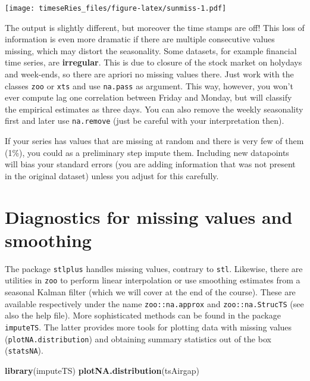 \documentclass[]{book}
\newenvironment{Shaded}{\begin{snugshade}}{\end{snugshade}}
\newcommand{\KeywordTok}[1]{\textcolor[rgb]{0.13,0.29,0.53}{\textbf{#1}}}
\newcommand{\NormalTok}[1]{#1}
\begin{document}
\texttt{[image: timeseRies\_files/figure-latex/sunmiss-1.pdf]}

The output is slightly different, but moreover the time stamps are off!
This loss of information is even more dramatic if there are multiple
consecutive values missing, which may distort the seasonality. Some
datasets, for example financial time series, are \textbf{irregular}.
This is due to closure of the stock market on holydays and week-ends, so
there are apriori no missing values there. Just work with the classes
\texttt{zoo} or \texttt{xts} and use \texttt{na.pass} as argument. This
way, however, you won't ever compute lag one correlation between Friday
and Monday, but will classify the empirical estimates as three days. You
can also remove the weekly seasonality first and later use
\texttt{na.remove} (just be careful with your interpretation then).

If your series has values that are missing at random and there is very
few of them (1\%), you could as a preliminary step impute them.
Including new datapoints will bias your standard errors (you are adding
information that was not present in the original dataset) unless you
adjust for this carefully.

\section{Diagnostics for missing values and
smoothing}\label{diagnostics-for-missing-values-and-smoothing}

The package \texttt{stlplus} handles missing values, contrary to
\texttt{stl}. Likewise, there are utilities in \texttt{zoo} to perform
linear interpolation or use smoothing estimates from a seasonal Kalman
filter (which we will cover at the end of the course). These are
available respectively under the name \texttt{zoo::na.approx} and
\texttt{zoo::na.StrucTS} (see also the help file). More sophisticated
methods can be found in the package \texttt{imputeTS}. The latter
provides more tools for plotting data with missing values
(\texttt{plotNA.distribution}) and obtaining summary statistics out of
the box (\texttt{statsNA}).

\begin{Shaded}
\begin{Highlighting}[]
\KeywordTok{library}\NormalTok{(imputeTS)}
\KeywordTok{plotNA.distribution}\NormalTok{(tsAirgap)}
\end{Highlighting}
\end{Shaded}
\end{document}
